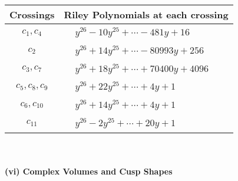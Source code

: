 \documentclass[1p]{elsarticle_modified}
\theoremstyle{definition}
\begin{document}
\begin{tabular}{m{50pt}|m{274pt}}
Crossings & \hspace{64pt}Riley Polynomials at each crossing \\
\hline $$\begin{aligned}c_{1},c_{4}\end{aligned}$$&$\begin{aligned}
&y^{26}-10 y^{25}+\cdots-481 y+16
\end{aligned}$\\
\hline $$\begin{aligned}c_{2}\end{aligned}$$&$\begin{aligned}
&y^{26}+14 y^{25}+\cdots-80993 y+256
\end{aligned}$\\
\hline $$\begin{aligned}c_{3},c_{7}\end{aligned}$$&$\begin{aligned}
&y^{26}+18 y^{25}+\cdots+70400 y+4096
\end{aligned}$\\
\hline $$\begin{aligned}c_{5},c_{8},c_{9}\end{aligned}$$&$\begin{aligned}
&y^{26}+22 y^{25}+\cdots+4 y+1
\end{aligned}$\\
\hline $$\begin{aligned}c_{6},c_{10}\end{aligned}$$&$\begin{aligned}
&y^{26}+14 y^{25}+\cdots+4 y+1
\end{aligned}$\\
\hline $$\begin{aligned}c_{11}\end{aligned}$$&$\begin{aligned}
&y^{26}-2 y^{25}+\cdots+20 y+1
\end{aligned}$\\
\hline
\end{tabular}\\~\\
\newpage\flushleft \textbf{(vi) Complex Volumes and Cusp Shapes}
\end{document}
